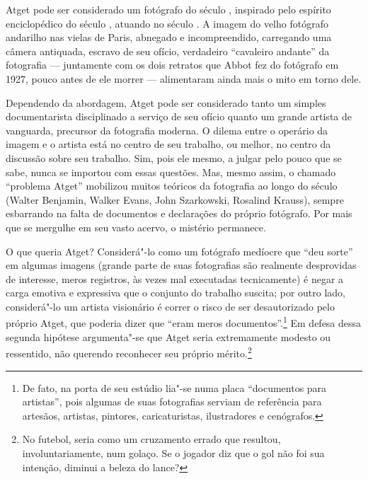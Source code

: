 Atget pode ser considerado um fotógrafo do século , inspirado pelo
espírito enciclopédico do século , atuando no século . A imagem
do velho fotógrafo andarilho nas vielas de Paris, abnegado e
incompreendido, carregando uma câmera antiquada, escravo de seu ofício,
verdadeiro ``cavaleiro andante'' da fotografia --- juntamente com os dois
retratos que Abbot fez do fotógrafo em 1927, pouco antes de ele morrer
--- alimentaram ainda mais o mito em torno dele.

Dependendo da abordagem, Atget pode ser considerado tanto um simples
documentarista disciplinado a serviço de seu ofício quanto um grande
artista de vanguarda, precursor da fotografia moderna. O dilema entre o
operário da imagem e o artista está no centro de seu trabalho, ou
melhor, no centro da discussão sobre seu trabalho. Sim, pois ele mesmo,
a julgar pelo pouco que se sabe, nunca se importou com essas questões.
Mas, mesmo assim, o chamado ``problema Atget'' mobilizou muitos
teóricos da fotografia ao longo do século  (Walter Benjamin, Walker
Evans, John Szarkowski, Rosalind Krauss), sempre esbarrando na falta de
documentos e declarações do próprio fotógrafo. Por mais que se mergulhe
em seu vasto acervo, o mistério permanece.

O que queria Atget? Considerá"-lo como um fotógrafo medíocre que ``deu
sorte'' em algumas imagens (grande parte de suas fotografias são
realmente desprovidas de interesse, meros registros, às vezes mal
executadas tecnicamente) é negar a carga emotiva e expressiva que o
conjunto do trabalho suscita; por outro lado, considerá"-lo um artista
visionário é correr o risco de ser desautorizado pelo próprio Atget, que
poderia dizer que ``eram meros documentos''.\footnote{De fato, na porta
  de seu estúdio lia"-se numa placa ``documentos para artistas'', pois
  algumas de suas fotografias serviam de referência para artesãos,
  artistas, pintores, caricaturistas, ilustradores e cenógrafos.} Em
defesa dessa segunda hipótese argumenta"-se que Atget seria extremamente
modesto ou ressentido, não querendo reconhecer seu próprio
mérito.\footnote{No futebol, seria como um cruzamento errado que
  resultou, involuntariamente, num golaço. Se o jogador diz que o gol
  não foi sua intenção, diminui a beleza do lance?}

